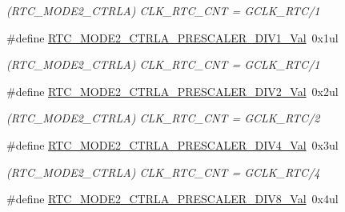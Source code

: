 \begin{DoxyCompactItemize}
\begin{DoxyCompactList}\small\item\em (R\+T\+C\+\_\+\+M\+O\+D\+E2\+\_\+\+C\+T\+R\+L\+A) C\+L\+K\+\_\+\+R\+T\+C\+\_\+\+C\+N\+T = G\+C\+L\+K\+\_\+\+R\+T\+C/1 \end{DoxyCompactList}\item 
\hypertarget{group___s_a_m_l21___r_t_c_ga61f302dee0e5a4258d8d4eb81b12d31c}{}\#define \hyperlink{group___s_a_m_l21___r_t_c_ga61f302dee0e5a4258d8d4eb81b12d31c}{R\+T\+C\+\_\+\+M\+O\+D\+E2\+\_\+\+C\+T\+R\+L\+A\+\_\+\+P\+R\+E\+S\+C\+A\+L\+E\+R\+\_\+\+D\+I\+V1\+\_\+\+Val}~0x1ul\label{group___s_a_m_l21___r_t_c_ga61f302dee0e5a4258d8d4eb81b12d31c}

\begin{DoxyCompactList}\small\item\em (R\+T\+C\+\_\+\+M\+O\+D\+E2\+\_\+\+C\+T\+R\+L\+A) C\+L\+K\+\_\+\+R\+T\+C\+\_\+\+C\+N\+T = G\+C\+L\+K\+\_\+\+R\+T\+C/1 \end{DoxyCompactList}\item 
\hypertarget{group___s_a_m_l21___r_t_c_ga9d3141c6fa717c767ad9a06b5e72ec0d}{}\#define \hyperlink{group___s_a_m_l21___r_t_c_ga9d3141c6fa717c767ad9a06b5e72ec0d}{R\+T\+C\+\_\+\+M\+O\+D\+E2\+\_\+\+C\+T\+R\+L\+A\+\_\+\+P\+R\+E\+S\+C\+A\+L\+E\+R\+\_\+\+D\+I\+V2\+\_\+\+Val}~0x2ul\label{group___s_a_m_l21___r_t_c_ga9d3141c6fa717c767ad9a06b5e72ec0d}

\begin{DoxyCompactList}\small\item\em (R\+T\+C\+\_\+\+M\+O\+D\+E2\+\_\+\+C\+T\+R\+L\+A) C\+L\+K\+\_\+\+R\+T\+C\+\_\+\+C\+N\+T = G\+C\+L\+K\+\_\+\+R\+T\+C/2 \end{DoxyCompactList}\item 
\hypertarget{group___s_a_m_l21___r_t_c_ga1b5e55629b6e73a12af4cbb3ee7ad94c}{}\#define \hyperlink{group___s_a_m_l21___r_t_c_ga1b5e55629b6e73a12af4cbb3ee7ad94c}{R\+T\+C\+\_\+\+M\+O\+D\+E2\+\_\+\+C\+T\+R\+L\+A\+\_\+\+P\+R\+E\+S\+C\+A\+L\+E\+R\+\_\+\+D\+I\+V4\+\_\+\+Val}~0x3ul\label{group___s_a_m_l21___r_t_c_ga1b5e55629b6e73a12af4cbb3ee7ad94c}

\begin{DoxyCompactList}\small\item\em (R\+T\+C\+\_\+\+M\+O\+D\+E2\+\_\+\+C\+T\+R\+L\+A) C\+L\+K\+\_\+\+R\+T\+C\+\_\+\+C\+N\+T = G\+C\+L\+K\+\_\+\+R\+T\+C/4 \end{DoxyCompactList}\item 
\hypertarget{group___s_a_m_l21___r_t_c_ga495698ab5aa1a8e8e2686e1b23deb4ed}{}\#define \hyperlink{group___s_a_m_l21___r_t_c_ga495698ab5aa1a8e8e2686e1b23deb4ed}{R\+T\+C\+\_\+\+M\+O\+D\+E2\+\_\+\+C\+T\+R\+L\+A\+\_\+\+P\+R\+E\+S\+C\+A\+L\+E\+R\+\_\+\+D\+I\+V8\+\_\+\+Val}~0x4ul\label{group___s_a_m_l21___r_t_c_ga495698ab5aa1a8e8e2686e1b23deb4ed}


\end{DoxyCompactItemize}
